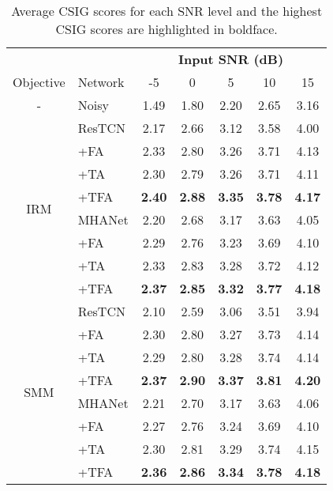 \begin{table}[!htbp]
    \centering
    \scriptsize
    \def\arraystretch{0.99}
    \setlength{\tabcolsep}{5.5pt}
    \caption{Average CSIG scores for each SNR level and the highest CSIG scores are highlighted in boldface.}
    \label{tab:csig}
    \begin{tabular}{@{}cl||ccccc@{}}
        \hline
        &  & \multicolumn{5}{c}{\textbf{Input SNR (dB)}}\\  
        \cline{3-7}
        Objective & Network & -5 & 0 & 5 & 10 & 15 \\
        \hline
        - & Noisy & 1.49 & 1.80 & 2.20 & 2.65 & 3.16 \\
        \hline
        \hline
        \multirow{8}{*}{IRM}
        & ResTCN & 2.17 & 2.66 & 3.12 & 3.58 & 4.00  \\
        & +FA    & 2.33 & 2.80 & 3.26 & 3.71 & 4.13  \\
        & +TA    & 2.30 & 2.79 & 3.26 & 3.71 & 4.11 \\
        & +TFA   & \textbf{2.40} & \textbf{2.88} & \textbf{3.35} & \textbf{3.78} & \textbf{4.17}\\
        \cline{2-7}
        & MHANet & 2.20 & 2.68 & 3.17 & 3.63 & 4.05  \\
        & +FA & 2.29 & 2.76 & 3.23 & 3.69 & 4.10  \\
        & +TA & 2.33 & 2.83 & 3.28 & 3.72 & 4.12 \\
        & +TFA & \textbf{2.37} & \textbf{2.85} & \textbf{3.32} & \textbf{3.77} & \textbf{4.18}\\
        \hline
        \hline
        
        \multirow{8}{*}{SMM}
        & ResTCN & 2.10 & 2.59 & 3.06 & 3.51 & 3.94\\
        & +FA    & 2.30 & 2.80 & 3.27 & 3.73 & 4.14\\
        & +TA    & 2.29 & 2.80 & 3.28 & 3.74 & 4.14\\
        & +TFA   & \textbf{2.37} & \textbf{2.90} & \textbf{3.37} & \textbf{3.81} & \textbf{4.20}\\
        \cline{2-7}
        & MHANet & 2.21 & 2.70 & 3.17 & 3.63 & 4.06 \\
        & +FA    & 2.27 & 2.76 & 3.24 & 3.69 & 4.10 \\
        & +TA    & 2.30 & 2.81 & 3.29 & 3.74 & 4.15 \\
        & +TFA   & \textbf{2.36} & \textbf{2.86} & \textbf{3.34} & \textbf{3.78} & \textbf{4.18}\\
        \hline
        \hline
        

\end{tabular}
\end{table}
